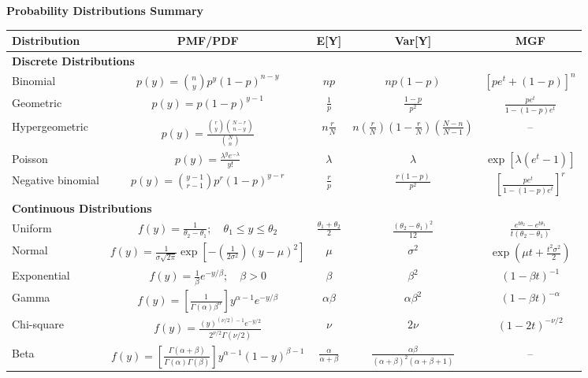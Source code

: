 \documentclass[10pt]{article}
\begin{document}
\begin{center}
\textbf{\Large Probability Distributions Summary}
\end{center}

\vspace{-2mm}
\noindent
\begin{minipage}[t]{0.72\textwidth}
\vspace{0pt} %
\renewcommand{\arraystretch}{1.6}
\begin{tabular}{@{}l c c c c@{}}
\toprule
\textbf{Distribution} & \textbf{PMF/PDF} & \textbf{E[Y]} & \textbf{Var[Y]} & \textbf{MGF} \\
\midrule
\multicolumn{5}{l}{\textbf{Discrete Distributions}} \\
Binomial & $p(y) = \binom{n}{y} p^y (1-p)^{n-y}$ & $np$ & $np(1-p)$ & $[pe^t + (1-p)]^n$ \\
Geometric & $p(y) = p(1-p)^{y-1}$ & $\frac{1}{p}$ & $\frac{1-p}{p^2}$ & $\frac{pe^t}{1-(1-p)e^t}$ \\
Hypergeometric & $p(y) = \frac{\binom{r}{y}\binom{N-r}{n-y}}{\binom{N}{n}}$ & $n\frac{r}{N}$ & $n\left(\frac{r}{N}\right)\left(1-\frac{r}{N}\right)\left(\frac{N-n}{N-1}\right)$ & -- \\
Poisson & $p(y) = \frac{\lambda^y e^{-\lambda}}{y!}$ & $\lambda$ & $\lambda$ & $\exp[\lambda(e^t - 1)]$ \\
Negative binomial & $p(y) = \binom{y-1}{r-1} p^r (1-p)^{y-r}$ & $\frac{r}{p}$ & $\frac{r(1-p)}{p^2}$ & $\left[\frac{pe^t}{1-(1-p)e^t}\right]^r$ \\
\midrule
\multicolumn{5}{l}{\textbf{Continuous Distributions}} \\
Uniform & $f(y) = \frac{1}{\theta_2 - \theta_1}; \quad \theta_1 \le y \le \theta_2$ & $\frac{\theta_1 + \theta_2}{2}$ & $\frac{(\theta_2 - \theta_1)^2}{12}$ & $\frac{e^{t\theta_2} - e^{t\theta_1}}{t(\theta_2 - \theta_1)}$ \\
Normal & $f(y) = \frac{1}{\sigma\sqrt{2\pi}}\exp\left[-\left(\frac{1}{2\sigma^2}\right)(y-\mu)^2\right]$ & $\mu$ & $\sigma^2$ & $\exp\left(\mu t + \frac{t^2\sigma^2}{2}\right)$ \\
Exponential & $f(y) = \frac{1}{\beta}e^{-y/\beta}; \quad \beta > 0$ & $\beta$ & $\beta^2$ & $(1-\beta t)^{-1}$ \\
Gamma & $f(y) = \left[\frac{1}{\Gamma(\alpha)\beta^\alpha}\right] y^{\alpha-1}e^{-y/\beta}$ & $\alpha\beta$ & $\alpha\beta^2$ & $(1-\beta t)^{-\alpha}$ \\
Chi-square & $f(y) = \frac{(y)^{(\nu/2)-1}e^{-y/2}}{2^{\nu/2}\Gamma(\nu/2)}$ & $\nu$ & $2\nu$ & $(1-2t)^{-\nu/2}$ \\
Beta & $f(y) = \left[\frac{\Gamma(\alpha+\beta)}{\Gamma(\alpha)\Gamma(\beta)}\right] y^{\alpha-1}(1-y)^{\beta-1}$ & $\frac{\alpha}{\alpha+\beta}$ & $\frac{\alpha\beta}{(\alpha+\beta)^2(\alpha+\beta+1)}$ & -- \\
\bottomrule
\end{tabular}
\end{minipage}%
\end{document}
